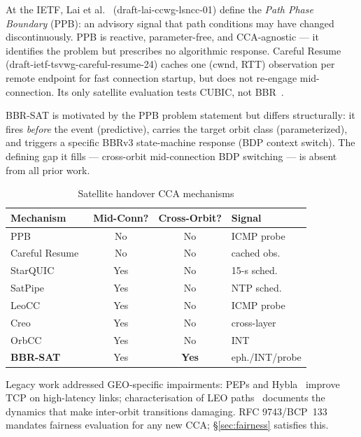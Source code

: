 \documentclass[conference]{IEEEtran}
\begin{document}
At the IETF, Lai et al.~\cite{lai2026lsncc} (draft-lai-ccwg-lsncc-01)
define the \emph{Path Phase Boundary} (PPB): an advisory signal that
path conditions may have changed discontinuously.
PPB is reactive, parameter-free, and CCA-agnostic --- it identifies the
problem but prescribes no algorithmic response.
Careful Resume~\cite{kuhn2025carefulresume} (draft-ietf-tsvwg-careful-resume-24)
caches one (cwnd, RTT) observation per remote endpoint for fast connection
startup, but does not re-engage mid-connection.
Its only satellite evaluation tests CUBIC, not BBR~\cite{hofstatter2025crsat}.

BBR-SAT is motivated by the PPB problem statement but differs structurally:
it fires \emph{before} the event (predictive), carries the target orbit
class (parameterized), and triggers a specific BBRv3 state-machine response
(BDP context switch).
The defining gap it fills --- cross-orbit mid-connection BDP switching ---
is absent from all prior work.

\begin{table}[t]
\centering
\caption{Satellite handover CCA mechanisms}
\label{tab:related}
\footnotesize
\setlength{\tabcolsep}{3pt}
\begin{tabular}{lccl}
\toprule
Mechanism & Mid-Conn? & Cross-Orbit? & Signal \\
\midrule
PPB~\cite{lai2026lsncc}                       & No       & No  & ICMP probe \\
Careful Resume~\cite{kuhn2025carefulresume}   & No       & No  & cached obs.\ \\
StarQUIC~\cite{zhao2024starquic}              & Yes      & No  & 15-s sched.\ \\
SatPipe~\cite{zhao2025satpipe}                & Yes      & No  & NTP sched.\ \\
LeoCC~\cite{lai2025leocc}                     & Yes      & No  & ICMP probe \\
Creo~\cite{yan2025creo}                       & Yes      & No  & cross-layer \\
OrbCC~\cite{valentine2025orbcc}               & Yes      & No  & INT \\
\textbf{BBR-SAT}                              & Yes      & \textbf{Yes} & eph./INT/probe \\
\bottomrule
\end{tabular}
\end{table}

Legacy work addressed GEO-specific impairments: PEPs and
Hybla~\cite{caini2004hybla} improve TCP on high-latency links;
characterisation of LEO paths~\cite{bhattacherjee2019,michel2022starlink}
documents the dynamics that make inter-orbit transitions damaging.
RFC 9743/BCP~133~\cite{duke2025rfc9743} mandates fairness evaluation for
any new CCA; \S\ref{sec:fairness} satisfies this.
\end{document}
